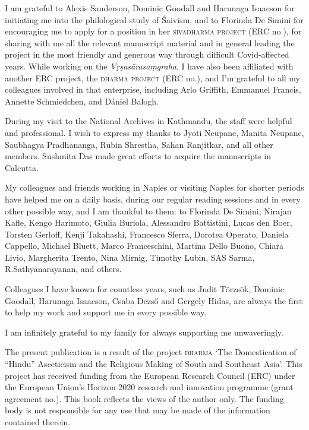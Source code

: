 \documentclass[11pt]{book}
\begin{document}
\noindent
I am grateful to Alexis Sanderson, Dominic Goodall and 
Harunaga Isaacson for initiating me into the philological 
study of Śaivism, and to Florinda De Simini for
encouraging me to apply for a position in her 
\textsc{\hbox{śivadharma} project} (ERC no.),
for sharing with me all the relevant manuscript material and
in general leading the project in the most friendly and 
generous way through difficult Covid-affected years.  
While working on the \textsl{Vṛṣa\-sāra\-saṃgraha}, 
I have also been affiliated with another ERC project, 
the \textsc{dharma project} (ERC no.), 
and I'm grateful to all my colleagues involved in that enterprise,
including Arlo Griffith, Emmanuel Francis, Annette Schmiedchen, 
and Dániel Balogh.

During my visit to the National Archives in Kathmandu, 
the staff were helpful and professional. I wish to express my thanks to Jyoti Neupane, Manita Neupane, Saubhagya Pradhananga, Rubin Shrestha, Sahan Ranjitkar, and all %
other members. Sushmita Das made great efforts to acquire the manuscripts in Calcutta.

My colleagues and friends working in Naples or visiting Naples for shorter periods have helped me on a daily basis, during our regular reading sessions and in every other possible way, and I am thankful to them: to Florinda De Simini, Nirajan Kafle, Kengo Harimoto, Giulia Buriola, Alessandro Battistini, Lucas den Boer, Torsten Gerloff, Kenji Takahashi, Francesco Sferra, Dorotea Operato, Daniela Cappello, Michael Bluett, Marco Franceschini, Martina Dello Buono, Chiara Livio, Margherita Trento, Nina Mirnig, Timothy Lubin, SAS Sarma, R.\thinspace Sathyanarayanan, and others.

Colleagues I have known for countless years, such as Judit Törzsök, Dominic Goodall, Harunaga Isaacson, Csaba Dezső 
and Gergely Hidas, are always the first
to help my work and support me in every possible way.

I am infinitely grateful to my family for always supporting me unwaveringly.

\bigskip

\noindent
{\footnotesize
The present publication is a result of the project \textsc{dharma} `The
Domestication of ``Hindu'' Asceticism and the Religious Making of South and Southeast Asia'.  This project has received funding from the European Research Council (ERC) under the European Union's Horizon 2020 research and innovation programme (grant agreement no.).  This book reflects the views of the author only.  The funding body is not responsible for any use that
may be made of the information contained therein.}
\end{document}
